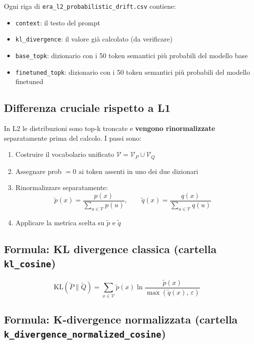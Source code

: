 \documentclass[12pt, a4paper]{article}
\begin{document}
Ogni riga di \texttt{era\_l2\_probabilistic\_drift.csv} contiene:
\begin{itemize}
    \item \texttt{context}: il testo del prompt
    \item \texttt{kl\_divergence}: il valore già calcolato (da verificare)
    \item \texttt{base\_topk}: dizionario con i 50 token semantici più probabili del modello base
    \item \texttt{finetuned\_topk}: dizionario con i 50 token semantici più probabili del modello finetuned
\end{itemize}

\subsection{Differenza cruciale rispetto a L1}

In L2 le distribuzioni sono top-k troncate e \textbf{vengono rinormalizzate}
separatamente prima del calcolo. I passi sono:

\begin{enumerate}
    \item Costruire il vocabolario unificato $\mathcal{V} = \mathcal{V}_P \cup \mathcal{V}_Q$
    \item Assegnare prob $= 0$ ai token assenti in uno dei due dizionari
    \item Rinormalizzare separatamente:
    \begin{equation}
        \tilde{p}(x) = \frac{p(x)}{\sum_{u \in \mathcal{V}} p(u)}, \qquad
        \tilde{q}(x) = \frac{q(x)}{\sum_{u \in \mathcal{V}} q(u)}
        \label{eq:renorm_l2}
    \end{equation}
    \item Applicare la metrica scelta su $\tilde{p}$ e $\tilde{q}$
\end{enumerate}

\subsection{Formula: KL divergence classica (cartella \texttt{kl\_cosine})}

\begin{equation}
    \mathrm{KL}(\tilde{P} \| \tilde{Q}) = \sum_{x \in \mathcal{V}} \tilde{p}(x)
    \ln \frac{\tilde{p}(x)}{\max(\tilde{q}(x),\, \varepsilon)}
    \label{eq:kl_l2}
\end{equation}

\subsection{Formula: K-divergence normalizzata (cartella \texttt{k\_divergence\_normalized\_cosine})}
\end{document}
